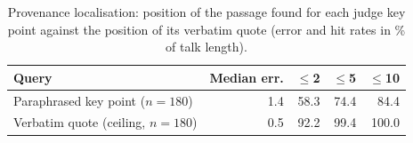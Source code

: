 \begin{table}[t]
\centering
\caption{Provenance localisation: position of the passage found for each judge key point against the position of its verbatim quote (error and hit rates in \% of talk length).}
\label{tab:provloc}
\footnotesize
\setlength{\tabcolsep}{3.5pt}
\begin{tabular}{lrrrr}
\toprule
Query & Median err. & $\le$2 & $\le$5 & $\le$10 \\
\midrule
Paraphrased key point ($n=180$) & 1.4 & 58.3 & 74.4 & 84.4 \\
Verbatim quote (ceiling, $n=180$) & 0.5 & 92.2 & 99.4 & 100.0 \\
\bottomrule
\end{tabular}
\end{table}

